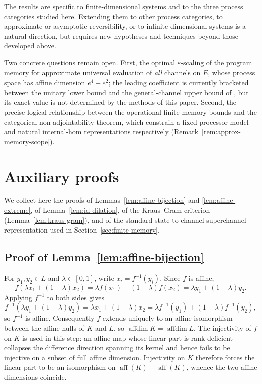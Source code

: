 \documentclass[11pt]{article}
\DeclareMathOperator{\affdim}{affdim}
\DeclareMathOperator{\aff}{aff}
\begin{document}
The results are specific to finite-dimensional systems and to the three
process categories studied here. Extending them to other process
categories, to approximate or asymptotic reversibility, or to
infinite-dimensional systems is a natural direction, but requires new
hypotheses and techniques beyond those developed above.

Two concrete questions remain open. First, the optimal $\varepsilon$-scaling
of the program memory for approximate universal evaluation of \emph{all}
channels on $E$, whose process space has affine dimension $e^4-e^2$; the leading
coefficient is currently bracketed between the unitary lower bound
\cite{YangRennerChiribella2020} and the general-channel upper bound of
\cite{YoshidaMiyazakiMurao2026}, but its exact value is not determined by the
methods of this paper. Second, the
precise logical relationship between the operational finite-memory bounds and the
categorical non-adjointability theorem, which constrain a fixed processor model
and natural internal-hom representations respectively
(Remark~\ref{rem:approx-memory-scope}).

\appendix
\section{Auxiliary proofs}

We collect here the proofs of Lemmas~\ref{lem:affine-bijection} and
\ref{lem:affine-extreme}, of Lemma~\ref{lem:id-dilation}, of the Kraus--Gram
criterion (Lemma~\ref{lem:kraus-gram}), and of the
standard state-to-channel superchannel representation used in
Section~\ref{sec:finite-memory}.

\subsection*{Proof of Lemma~\ref{lem:affine-bijection}}

For $y_1,y_2\in L$ and $\lambda\in[0,1]$, write $x_i=f^{-1}(y_i)$. Since
$f$ is affine,
\[
f(\lambda x_1+(1-\lambda)x_2)
=
\lambda f(x_1)+(1-\lambda)f(x_2)
=
\lambda y_1+(1-\lambda)y_2.
\]
Applying $f^{-1}$ to both sides gives
\[
f^{-1}(\lambda y_1+(1-\lambda)y_2)
=
\lambda x_1+(1-\lambda)x_2
=
\lambda f^{-1}(y_1)+(1-\lambda)f^{-1}(y_2),
\]
so $f^{-1}$ is affine. Consequently $f$ extends uniquely to an affine
isomorphism between the affine hulls of $K$ and $L$, so
$\affdim K=\affdim L$. The injectivity of $f$ on $K$ is used in this step: an
affine map whose linear part is rank-deficient collapses the difference
direction spanning its kernel and hence fails to be injective on a subset of
full affine dimension. Injectivity on $K$ therefore forces the linear part to
be an isomorphism on $\aff(K)-\aff(K)$, whence the two affine dimensions
coincide.
\end{document}
